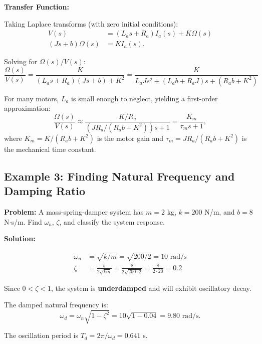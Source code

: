 \textbf{Transfer Function:}

Taking Laplace transforms (with zero initial conditions):
\begin{align}
V(s) &= (L_a s + R_a)I_a(s) + K\Omega(s) \\
(Js + b)\Omega(s) &= KI_a(s).
\end{align}

Solving for $\Omega(s)/V(s)$:
\begin{equation}
\boxed{\frac{\Omega(s)}{V(s)} = \frac{K}{(L_a s + R_a)(Js + b) + K^2} = \frac{K}{L_a J s^2 + (L_a b + R_a J)s + (R_a b + K^2)}}
\end{equation}

For many motors, $L_a$ is small enough to neglect, yielding a first-order approximation:
\begin{equation}
\frac{\Omega(s)}{V(s)} \approx \frac{K/R_a}{(JR_a/(R_ab + K^2))s + 1} = \frac{K_m}{\tau_m s + 1},
\end{equation}
where $K_m = K/(R_ab + K^2)$ is the motor gain and $\tau_m = JR_a/(R_ab + K^2)$ is the mechanical time constant.

\hrulefill

\subsection{Example 3: Finding Natural Frequency and Damping Ratio}

\textbf{Problem:} A mass-spring-damper system has $m = 2$ kg, $k = 200$ N/m, and $b = 8$ N$\cdot$s/m. Find $\omega_n$, $\zeta$, and classify the system response.

\textbf{Solution:}

\begin{align}
\omega_n &= \sqrt{k/m} = \sqrt{200/2} = 10 \text{ rad/s} \\
\zeta &= \frac{b}{2\sqrt{km}} = \frac{8}{2\sqrt{200 \cdot 2}} = \frac{8}{2 \cdot 20} = 0.2
\end{align}

Since $0 < \zeta < 1$, the system is \textbf{underdamped} and will exhibit oscillatory decay.

The damped natural frequency is:
\begin{equation}
\omega_d = \omega_n\sqrt{1-\zeta^2} = 10\sqrt{1-0.04} = 9.80 \text{ rad/s}.
\end{equation}

The oscillation period is $T_d = 2\pi/\omega_d = 0.641$ s.

\hrulefill

